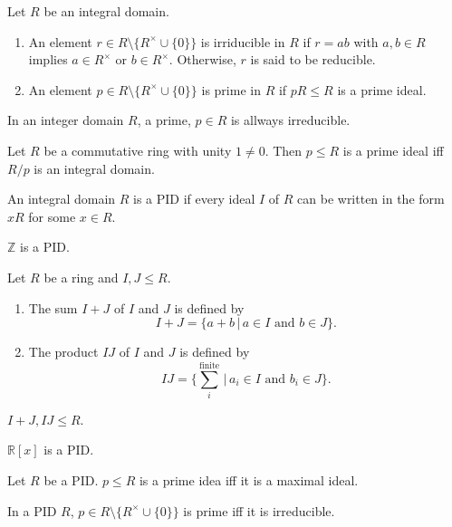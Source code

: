 \documentclass{article}
\begin{document}
\begin{defi}
	Let \(R\) be an integral domain.
	\begin{enumerate}
		\item An element \(r\in R\setminus\{R^\times\cup\{0\}\}\) is irriducible in \(R\) if \(r=ab\) with \(a,b\in R\) implies \(a\in R^\times\) or \(b\in R^\times\). Otherwise, \(r\) is said to be reducible.
		\item An element \(p\in R\setminus\{R^\times\cup\{0\}\}\) is prime in \(R\) if \(pR\leq R\) is a prime ideal.
	\end{enumerate}
\end{defi}
\begin{rema}
	In an integer domain \(R\), a prime, \(p\in R\) is allways irreducible.
\end{rema}
\begin{lem}
	Let \(R\) be a commutative ring with unity \(1\neq 0\). Then \(p\leq R\) is a prime ideal iff \(R/p\) is an integral domain.
\end{lem}
\begin{defi}
	An integral domain \(R\) is a PID if every ideal \(I\) of \(R\) can be written in the form \(xR\) for some \(x\in R\).
\end{defi}
\begin{rema}
	\(\mathbb{Z}\) is a PID.
\end{rema}
\begin{defi}
	Let \(R\) be a ring and \(I,J\leq R\).
	\begin{enumerate}
		\item The sum \(I+J\) of \(I\) and \(J\) is defined by
			\begin{equation*}
				I+J=\{a+b\,|\,a\in I\text{ and }b\in J\}.
			\end{equation*}
		\item The product \(IJ\) of \(I\) and \(J\) is defined by
			\begin{equation*}
				IJ=\bigg\{\sum_i^{\text{finite}}\,\bigg|\,a_i\in I\text{ and }b_i\in J\bigg\}.
			\end{equation*}
	\end{enumerate}
\end{defi}
\begin{rema}
	\(I+J,IJ\leq R\).
\end{rema}
\begin{thm}
	\(\mathbb{R}[x]\) is a PID.
\end{thm}
\begin{lem}
	Let \(R\) be a PID. \(p\leq R\) is a prime idea iff it is a maximal ideal.
\end{lem}
\begin{lem}
	In a PID \(R\), \(p\in R\setminus\{R^\times\cup\{0\}\}\) is prime iff it is irreducible.
\end{lem}
\end{document}
